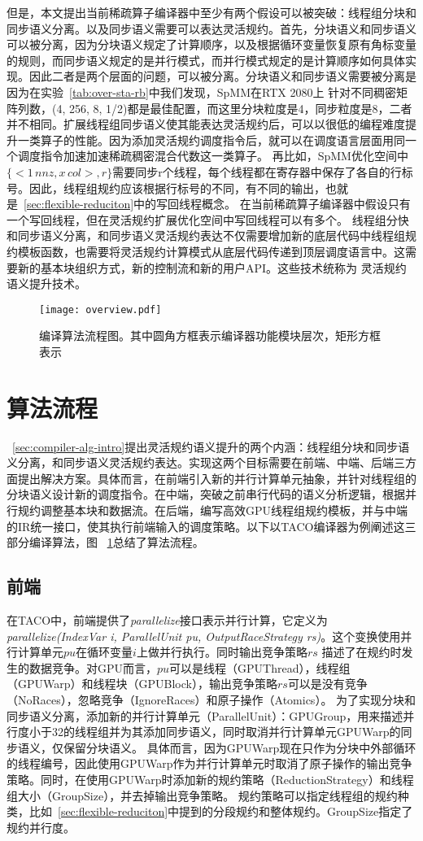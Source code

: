 但是，本文提出当前稀疏算子编译器中至少有两个假设可以被突破：线程组分块和同步语义分离。以及同步语义需要可以表达灵活规约。首先，分块语义和同步语义可以被分离，因为分块语义规定了计算顺序，以及根据循环变量恢复原有角标变量
的规则，而同步语义规定的是并行模式，而并行模式规定的是计算顺序如何具体实现。因此二者是两个层面的问题，可以被分离。分块语义和同步语义需要被分离是因为在实验~\ref{tab:over-sta-rb}中我们发现，SpMM在RTX 2080上
针对不同稠密矩阵列数，(4, 256, 8, 1/2)都是最佳配置，而这里分块粒度是4，同步粒度是8，二者并不相同。扩展线程组同步语义使其能表达灵活规约后，可以以很低的编程难度提升一类算子的性能。因为添加灵活规约调度指令后，就可以在调度语言层面用同一个调度指令加速加速稀疏稠密混合代数这一类算子。
再比如，SpMM优化空间中$\{<1\,nnz , x\,col>,r\}$需要同步r个线程，每个线程都在寄存器中保存了各自的行标号。因此，线程组规约应该根据行标号的不同，有不同的输出，也就是~\ref{sec:flexible-reduciton}中的写回线程概念。
在当前稀疏算子编译器中假设只有一个写回线程，但在灵活规约扩展优化空间中写回线程可以有多个。
线程组分快和同步语义分离，和同步语义灵活规约表达不仅需要增加新的底层代码中线程组规约模板函数，也需要将灵活规约计算模式从底层代码传递到顶层调度语言中。这需要新的基本块组织方式，新的控制流和新的用户API。这些技术统称为
灵活规约语义提升技术。
\begin{figure}[h]%
  \centering
  \texttt{[image: overview.pdf]}
  \caption{编译算法流程图。其中圆角方框表示编译器功能模块层次，矩形方框表示}\label{fig:compiler-overview}
\end{figure}
\section{算法流程}
~\ref{sec:compiler-alg-intro}提出灵活规约语义提升的两个内涵：线程组分块和同步语义分离，和同步语义灵活规约表达。实现这两个目标需要在前端、中端、后端三方面提出解决方案。具体而言，在前端引入新的并行计算单元抽象，并针对线程组的
分块语义设计新的调度指令。在中端，突破之前串行代码的语义分析逻辑，根据并行规约调整基本块和数据流。在后端，编写高效GPU线程组规约模板，并与中端的IR统一接口，使其执行前端输入的调度策略。以下以TACO编译器为例阐述这三部分编译算法，图
~\ref{fig:compiler-overview}总结了算法流程。
\subsection{前端}
在TACO中，前端提供了\textit{parallelize}接口表示并行计算，它定义为\textit{parallelize(IndexVar i, ParallelUnit pu, OutputRaceStrategy rs)}。这个变换使用并行计算单元$pu$在循环变量$i$上做并行执行。同时输出竞争策略$rs$
描述了在规约时发生的数据竞争。对GPU而言，$pu$可以是线程（GPUThread），线程组（GPUWarp）和线程块（GPUBlock），输出竞争策略$rs$可以是没有竞争（NoRaces），忽略竞争（IgnoreRaces）和原子操作（Atomics）。
为了实现分块和同步语义分离，添加新的并行计算单元（ParallelUnit）：GPUGroup，用来描述并行度小于32的线程组并为其添加同步语义，同时取消并行计算单元GPUWarp的同步语义，仅保留分块语义。
具体而言，因为GPUWarp现在只作为分块中外部循环的线程编号，因此使用GPUWarp作为并行计算单元时取消了原子操作的输出竞争策略。同时，在使用GPUWarp时添加新的规约策略（ReductionStrategy）和线程组大小（GroupSize），并去掉输出竞争策略。
规约策略可以指定线程组的规约种类，比如~\ref{sec:flexible-reduciton}中提到的分段规约和整体规约。GroupSize指定了规约并行度。
